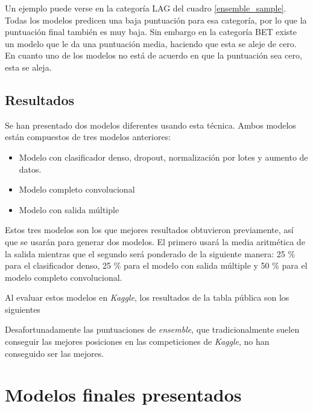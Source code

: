 \begin{itemize}
Un ejemplo puede verse en la categoría LAG del cuadro \ref{ensemble_sample}.
Todas los modelos predicen una baja puntuación para esa categoría, por lo que la
puntuación final también es muy baja. Sin embargo en la categoría BET existe un
modelo que le da una puntuación media, haciendo que esta se aleje de cero. En
cuanto uno de los modelos no está de acuerdo en que la puntuación sea cero, esta
se aleja.

\subsection{Resultados}

Se han presentado dos modelos diferentes usando esta técnica. Ambos modelos
están compuestos de tres modelos anteriores:

\begin{itemize}
    \item{Modelo con clasificador denso, dropout, normalización por lotes y
        aumento de datos.}
    \item{Modelo completo convolucional}
    \item{Modelo con salida múltiple}
\end{itemize}

Estos tres modelos son los que mejores resultados obtuvieron previamente, así
que se usarán para generar dos modelos. El primero usará la media aritmética de
la salida mientras que el segundo será ponderado de la siguiente manera: 25 \%
para el clasificador denso, 25 \% para el modelo con salida múltiple y 50 \%
para el modelo completo convolucional.

Al evaluar estos modelos en \textit{Kaggle}, los resultados de la tabla pública
son los siguientes

\begin{itemize}
    \item{Media aritmética sobre los tres modelos: \textbf{0.9175}
    \item{Media ponderada favoreciendo el modelo completo convolucional: \textbf{0.8975}
\end{itemize}

Desafortunadamente las puntuaciones de \textit{ensemble}, que tradicionalmente suelen conseguir las mejores posiciones en las competiciones de \textit{Kaggle}, no han conseguido ser las mejores.

\section{Modelos finales presentados}


\end{itemize}
